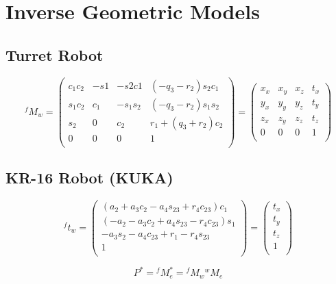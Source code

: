 \documentclass[11pt, oneside]{article}   	%
\begin{document}
\section{Inverse Geometric Models}

\subsection{Turret Robot}

\begin{equation*}
^fM_w= 
\begin{pmatrix}
c_1 c_2 & -s1 & -s2 c1 & (-q_3 - r_2) s_2  c_1 \\
s_1 c_2& c_1 & -s_1 s_2& (-q_3 - r_2) s_1 s_2 \\
s_2  & 0  & c_2 & r_1 + (q_3 + r_2) c_2  \\
0 & 0 & 0 & 1\\
\end{pmatrix}
=
\begin{pmatrix}
x_x& x_y & x_z & t_x \\
y_x& y_y & y_z & t_y\\
z_x  & z_y  & z_z & t_z  \\
0 & 0 & 0 & 1\\
\end{pmatrix}
\end{equation*}

\subsection{KR-16 Robot (KUKA)}

\begin{equation*}
^{f}t_w = 
\begin{pmatrix}
(a_2 + a_3 c_2 - a_4 s_{23} + r_4 c_{23}) c_1 \\
(-a_2 -a_3 c_2 + a_4 s_{23} -r_4 c_{23}) s_1 \\
-a_3 s_2 - a_4 c_{23} + r_1 - r_4 s_{23}   \\
 1\\
\end{pmatrix}
=
\begin{pmatrix}
t_x\\
t_y\\
t_z\\
1\\
\end{pmatrix}
\end{equation*}

\begin{equation*}
P^* = {}^fM_e^* = {}^fM_w{}^wM_e
\end{equation*}
\end{document}
